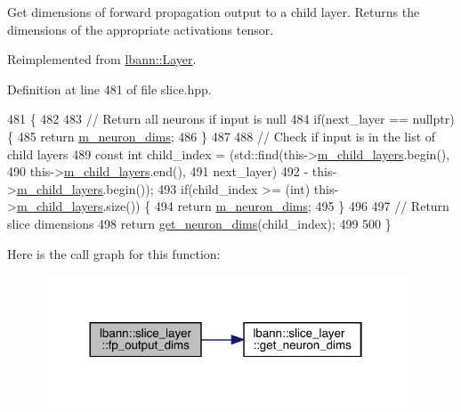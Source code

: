 Get dimensions of forward propagation output to a child layer. Returns the dimensions of the appropriate activations tensor. 

Reimplemented from \hyperlink{classlbann_1_1Layer_a22d31298912405660ebb210c0d7c5373}{lbann\+::\+Layer}.



Definition at line 481 of file slice.\+hpp.


\begin{DoxyCode}
481                                                                         \{
482 
483     \textcolor{comment}{// Return all neurons if input is null}
484     \textcolor{keywordflow}{if}(next\_layer == \textcolor{keyword}{nullptr}) \{
485       \textcolor{keywordflow}{return} \hyperlink{classlbann_1_1Layer_abb34bb8031f57a483e2e327a5f229f48}{m\_neuron\_dims};
486     \}
487 
488     \textcolor{comment}{// Check if input is in the list of child layers}
489     \textcolor{keyword}{const} \textcolor{keywordtype}{int} child\_index = (std::find(this->\hyperlink{classlbann_1_1Layer_ae348c0d2b4d05f74d809d09debb633c0}{m\_child\_layers}.begin(),
490                                        this->\hyperlink{classlbann_1_1Layer_ae348c0d2b4d05f74d809d09debb633c0}{m\_child\_layers}.end(),
491                                        next\_layer)
492                              - this->\hyperlink{classlbann_1_1Layer_ae348c0d2b4d05f74d809d09debb633c0}{m\_child\_layers}.begin());
493     \textcolor{keywordflow}{if}(child\_index >= (\textcolor{keywordtype}{int}) this->\hyperlink{classlbann_1_1Layer_ae348c0d2b4d05f74d809d09debb633c0}{m\_child\_layers}.size()) \{
494       \textcolor{keywordflow}{return} \hyperlink{classlbann_1_1Layer_abb34bb8031f57a483e2e327a5f229f48}{m\_neuron\_dims};
495     \}
496 
497     \textcolor{comment}{// Return slice dimensions}
498     \textcolor{keywordflow}{return} \hyperlink{classlbann_1_1slice__layer_a824178abe2450bd331304ab0d50214ce}{get\_neuron\_dims}(child\_index);
499 
500   \}
\end{DoxyCode}
Here is the call graph for this function\+:\nopagebreak
\begin{figure}[H]
\begin{center}
\leavevmode
\includegraphics[width=308pt]{classlbann_1_1slice__layer_a086c918fe72f28248f987d6a3aef355d_cgraph}
\end{center}
\end{figure}
\mbox{\label{classlbann_1_1slice__layer_a5121b600d26654707289726e84c0eed9}} 
